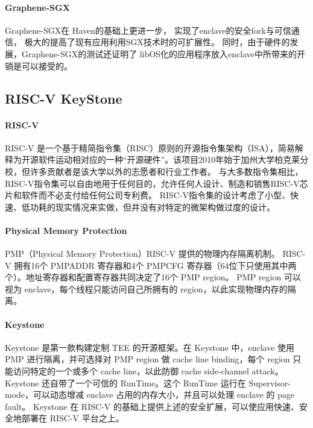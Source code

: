 \paragraph{Graphene-SGX}Graphene-SGX在 Haven的基础上更进一步，
实现了enclave的安全fork与可信通信，
极大的提高了现有应用利用SGX技术时的可扩展性。
同时，由于硬件的发展，Graphene-SGX的测试还证明了
libOS化的应用程序放入enclave中所带来的开销是可以接受的。

\subsection{RISC-V KeyStone}
\paragraph{RISC-V}
RISC-V\cite{keystone-p4} 是一个基于精简指令集（RISC）原则的开源指令集架构（ISA），简易解释为开源软件运动相对应的一种“开源硬件”。该项目2010年始于加州大学柏克莱分校，但许多贡献者是该大学以外的志愿者和行业工作者。
与大多数指令集相比，RISC-V指令集可以自由地用于任何目的，允许任何人设计、制造和销售RISC-V芯片和软件而不必支付给任何公司专利费。
RISC-V指令集的设计考虑了小型、快速、低功耗的现实情况来实做，但并没有对特定的微架构做过度的设计。
\paragraph{Physical Memory Protection}
PMP（Physical Memory Protection）RISC-V 提供的物理内存隔离机制\cite{keystone-p4}。
RISC-V 拥有16个 PMPADDR 寄存器和4个 PMPCFG 寄存器（64位下只使用其中两个）\cite{keystone-p2}。地址寄存器和配置寄存器共同决定了16个 PMP region。
PMP region 可以视为 enclave，每个线程只能访问自己所拥有的 region，以此实现物理内存的隔离。
\paragraph{Keystone}
Keystone\cite{keystone-p1} 是第一款构建定制 TEE 的开源框架。在 Keystone 中，enclave 使用 PMP 进行隔离，并可选择对 PMP region 做 cache line binding，每个 region 只能访问特定的一个或多个 cache line，以此防御 cache side-channel attack。
Keystone 还自带了一个可信的 RunTime。这个 RunTime 运行在 Supervisor-mode，可以动态增减 enclave 占用的内存大小，并且可以处理 enclave 的 page fault。
Keystone 在 RISC-V 的基础上提供上述的安全扩展，可以使应用快速、安全地部署在 RISC-V 平台之上。